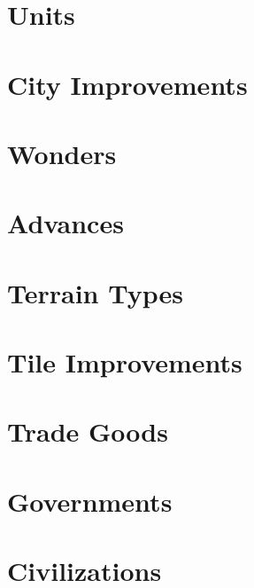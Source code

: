 \appendix

\chapter{Units}

\chapter{City Improvements}

\chapter{Wonders}

\chapter{Advances}

\chapter{Terrain Types}

\chapter{Tile Improvements}

\chapter{Trade Goods}

\chapter{Governments}

\chapter{Civilizations}

\printindex

